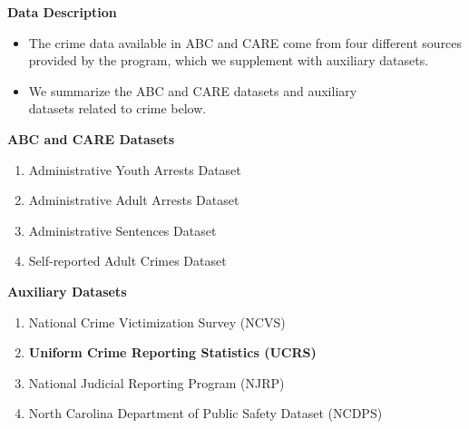 \documentclass[static]{JJH-Beamer}
\begin{document}
\begin{frame}
 \addtocounter{framenumber}{-1}

\begin{center}
\textbf{Data Description}
\end{center}

\end{frame}

\begin{frame}
 \addtocounter{framenumber}{-1}

\begin{itemize}
\item The crime data available in ABC and CARE come from four different sources provided by the program, which we supplement with auxiliary datasets.
\item We summarize the ABC and CARE datasets and auxiliary\\ datasets related to crime below.
\end{itemize}

\end{frame}

\begin{frame}
 \addtocounter{framenumber}{-1}

\begin{center}
\textbf{ABC and CARE Datasets}
\end{center}
\begin{enumerate}
\item Administrative Youth Arrests Dataset
\item Administrative Adult Arrests Dataset
\item Administrative Sentences Dataset
\item Self-reported Adult Crimes Dataset
\end{enumerate}

\end{frame}

\begin{frame}
 \addtocounter{framenumber}{-1}

\begin{center}
\textbf{Auxiliary Datasets}
\end{center}
\begin{enumerate}
\item National Crime Victimization Survey (NCVS)
\item \textbf{Uniform Crime Reporting Statistics (UCRS)}
\item National Judicial Reporting Program (NJRP)
\item North Carolina Department of Public Safety Dataset (NCDPS)
\end{enumerate}

\end{frame}
\end{document}
